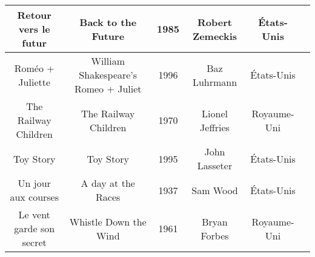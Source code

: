 \documentclass[a4paper]{article}
\begin{document}
\begin{tabular}{|c|c|c|c|c|c|}
\hline 
Retour vers le futur & Back to the Future & 1985 & Robert Zemeckis & États-Unis &  \\ 
\hline 
Roméo + Juliette & William Shakespeare's Romeo + Juliet & 1996 & Baz Luhrmann & États-Unis &  \\ 
\hline 
The Railway Children & The Railway Children & 1970 & Lionel Jeffries & Royaume-Uni &  \\ 
\hline 
Toy Story & Toy Story & 1995 & John Lasseter & États-Unis &  \\ 
\hline 
Un jour aux courses & A day at the Races & 1937 & Sam Wood & États-Unis &  \\ 
\hline 
Le vent garde son secret & Whistle Down the Wind & 1961 & Bryan Forbes & Royaume-Uni &  \\ 
\hline 
\end{tabular}
\end{document}
